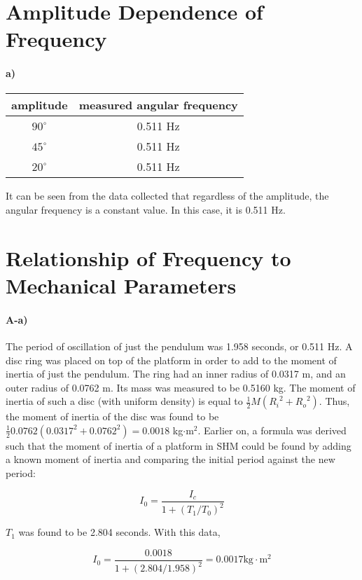 \documentclass[12pt]{article}
\begin{document}
\section{Amplitude Dependence of Frequency}

\paragraph{a)}
\begin{tabular}{|c|c|}
\hline
amplitude & measured angular frequency\\
\hline
$90^\circ$ & 0.511 Hz \\
$45^\circ$ & 0.511 Hz \\
$20^\circ$ & 0.511 Hz \\
\hline
\end{tabular}

It can be seen from the data collected that regardless of the amplitude,
the angular frequency is a constant value.  In this case, it is 0.511 Hz.

\newpage

\section{Relationship of Frequency to Mechanical Parameters}

\paragraph{A-a)}

The period of oscillation of just the pendulum was 1.958 seconds, or 0.511
Hz.  A disc ring was placed on top of the platform in order to add to the
moment of inertia of just the pendulum.  The ring had an inner radius of 
0.0317 m, and an outer radius of 0.0762 m.  Its mass was measured to be 
0.5160 kg.  The moment of inertia of such a disc (with uniform density) is
equal to \(\frac{1}{2}M({R_i}^2 + {R_o}^2)\).  Thus, the moment of inertia
of the disc was found to be \(\frac{1}{2}0.0762(0.0317^2 + 0.0762^2)
= 0.0018\) kg$\cdot$m$^2$.  Earlier on, a formula was derived such that the moment
of inertia of a platform in SHM could be found by adding a known moment of
inertia and comparing the initial period against the new period:

\[I_0 = \frac{I_c}{1+(T_1/T_0)^2}\]

$T_1$ was found to be 2.804 seconds.  With this data,

\[I_0 = \frac{0.0018}{1+(2.804/1.958)^2} = 0.0017 \textrm{kg$\cdot$m$^2$}\]
\end{document}
